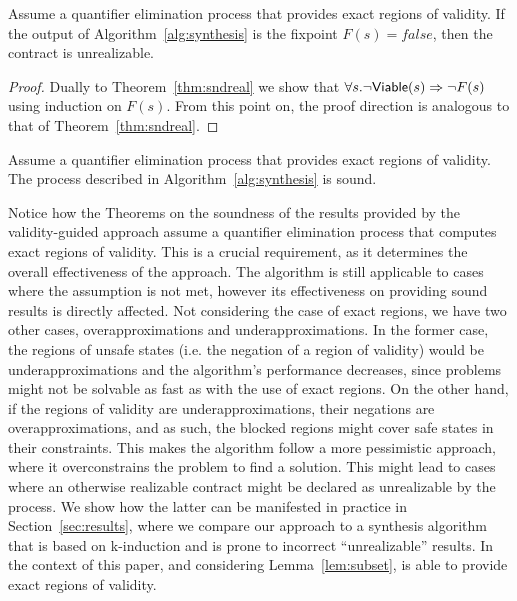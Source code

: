 
\begin{theorem}
\label{thm:sndunreal}

Assume a quantifier elimination process that provides exact regions of validity. If the output of Algorithm~\ref{alg:synthesis} is the fixpoint $F(s) = false$, then the contract is unrealizable.
\end{theorem}
\begin{proof}
Dually to Theorem~\ref{thm:sndreal} we show that $\forall s. \lnot {\mathsf {Viable}}(s) \Rightarrow \lnot F(s)$ using induction on $F(s)$. From this point on, the proof direction is analogous to that of Theorem~\ref{thm:sndreal}.
\end{proof}


\begin{corollary}
Assume a quantifier elimination process that provides exact regions of validity. The process described in Algorithm~\ref{alg:synthesis} is sound.
\end{corollary}

Notice how the Theorems on the soundness of the results provided by the validity-guided approach assume a quantifier elimination process that computes exact regions of validity. This is a crucial requirement, as it determines the overall effectiveness of the approach. The algorithm is still applicable to cases where the assumption is not met, however its effectiveness on providing sound results is directly affected. Not considering the case of exact regions, we have two other cases, overapproximations and underapproximations. In the former case, the regions of unsafe states (i.e. the negation of a region of validity) would be underapproximations and the algorithm's performance decreases, since problems might not be solvable as fast as with the use of exact regions. On the other hand, if the regions of validity are underapproximations, their negations are overapproximations, and as such, the blocked regions might cover safe states in their constraints. This makes the algorithm follow a more pessimistic approach, where it overconstrains the problem to find a solution. This might lead to cases where an otherwise realizable contract might be declared as unrealizable by the process. We show how the latter can be manifested in practice in Section~\ref{sec:results}, where we compare our approach to a synthesis algorithm that is based on k-induction and is prone to incorrect ``unrealizable'' results. In the context of this paper, and considering Lemma~\ref{lem:subset}, \aeval is able to provide exact regions of validity.
\fi

